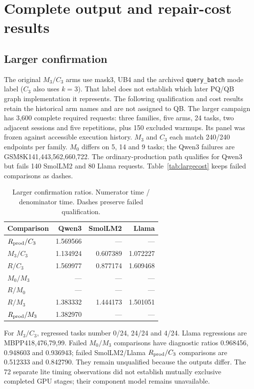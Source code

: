 \section{Complete output and repair-cost results}
\label{supp:confirmation}\label{supp:cost}
\subsection{Larger confirmation}
The original $M_3/C_3$ arms use mask3, UB4 and the archived \texttt{query\_batch} mode label ($C_3$ also uses $k=3$). That label does not establish which later PQ/QB graph implementation it represents. The following qualification and cost results retain the historical arm names and are not assigned to QB.
The larger campaign has 3,600 complete required requests: three families, five arms, 24 tasks, two adjacent sessions and five repetitions, plus 150 excluded warmups. Its panel was frozen against accessible execution history. $M_3$ and $C_3$ each match 240/240 endpoints per family. $M_0$ differs on 5, 14 and 9 tasks; the Qwen3 failures are GSM8K141,443,562,660,722. The ordinary-production path qualifies for Qwen3 but fails 140 SmolLM2 and 80 Llama requests. Table~\ref{tab:largecost} keeps failed comparisons as dashes.
\begin{table}[t]\centering\small
\caption{Larger confirmation ratios. Numerator time / denominator time. Dashes preserve failed qualification.}
\label{tab:largecost}
\label{tab:confirmationratios}
\begin{tabular}{@{}lrrr@{}}\toprule
Comparison&Qwen3&SmolLM2&Llama\\\midrule
$R_{\rm prod}/C_3$&1.569566&---&---\\
$M_3/C_3$&1.134924&0.607389&1.072227\\
$R/C_3$&1.569977&0.877174&1.609468\\
$M_0/M_3$&---&---&---\\
$R/M_0$&---&---&---\\
$R/M_3$&1.383332&1.444173&1.501051\\
$R_{\rm prod}/M_3$&1.382970&---&---\\\bottomrule
\end{tabular}
\end{table}
For $M_3/C_3$, regressed tasks number 0/24, 24/24 and 4/24. Llama regressions are MBPP418,476,79,99. Failed $M_0/M_3$ comparisons have diagnostic ratios 0.968456, 0.948603 and 0.936943; failed SmolLM2/Llama $R_{\rm prod}/C_3$ comparisons are 0.512333 and 0.842790. They remain unqualified because the outputs differ. The 72 separate lite timing observations did not establish mutually exclusive completed GPU stages; their component model remains unavailable.

